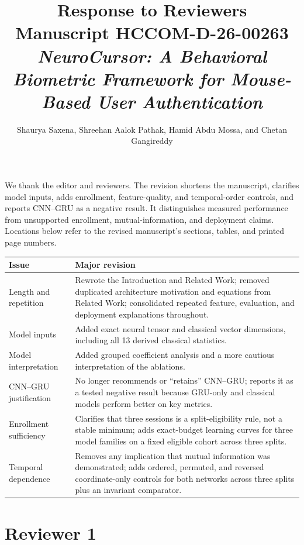\documentclass[11pt]{article}
\title{Response to Reviewers\\
\large Manuscript HCCOM-D-26-00263\\
\textit{NeuroCursor: A Behavioral Biometric Framework for Mouse-Based User Authentication}}
\author{Shaurya Saxena, Shreehan Aalok Pathak, Hamid Abdu Mossa, and Chetan Gangireddy}
\date{}
\begin{document}
\maketitle

We thank the editor and reviewers. The revision shortens the manuscript,
clarifies model inputs, adds enrollment, feature-quality, and temporal-order
controls, and reports CNN--GRU as a negative result. It distinguishes measured
performance from unsupported enrollment, mutual-information, and deployment
claims. Locations below refer to the revised manuscript's sections, tables,
and printed page numbers.

\begin{center}
\begin{tabular}{p{}p{}}
\toprule
\textbf{Issue} & \textbf{Major revision} \\
\midrule
Length and repetition & Rewrote the Introduction and Related Work; removed
duplicated architecture motivation and equations from Related Work; consolidated
repeated feature, evaluation, and deployment explanations throughout. \\
Model inputs & Added exact neural tensor and classical vector dimensions,
including all 13 derived classical statistics. \\
Model interpretation & Added grouped coefficient analysis and a more cautious
interpretation of the ablations. \\
CNN--GRU justification & No longer recommends or ``retains'' CNN--GRU; reports
it as a tested negative result because GRU-only and classical models perform
better on key metrics. \\
Enrollment sufficiency & Clarifies that three sessions is a split-eligibility
rule, not a stable minimum; adds exact-budget learning curves for three model
families on a fixed eligible cohort across three splits. \\
Temporal dependence & Removes any implication that mutual information was
demonstrated; adds ordered, permuted, and reversed coordinate-only
controls for both networks across three splits plus an invariant comparator. \\
\bottomrule
\end{tabular}
\end{center}

\section*{Reviewer 1}
\end{document}

